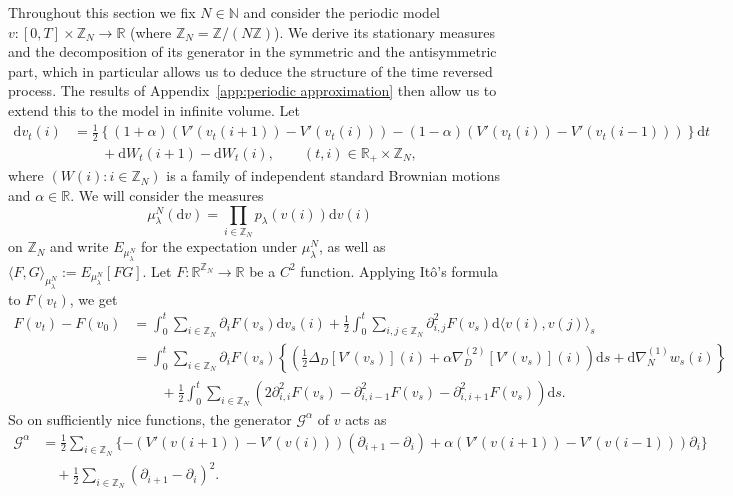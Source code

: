 \documentclass[11pt, a4paper]{article}
\newcommand{\assign}{:=}
\newcommand{\mathd}{\mathrm{d}}
\newcommand{\CG}{\mathscr{G}}
\newcommand{\R}{\mathbb{R}}
\newcommand{\1}{\mathbf{1}}
\newcommand{\Z}{\mathbb{Z}}
\begin{document}
Throughout this section we fix $N \in \mathbb{N}$ and consider the periodic
model $v : [0, T] \times \mathbb{Z}_N \rightarrow \mathbb{R}$ (where
$\mathbb{Z}_N =\mathbb{Z}/ (N\mathbb{Z})$). We derive its stationary
measures and the decomposition of its generator in the symmetric and the
antisymmetric part, which in particular allows us to deduce the structure of
the time reversed process. The results of Appendix~\ref{app:periodic
approximation} then allow us to extend this to the model in infinite volume.
Let
\begin{align}
  \label{eq:periodic GL}\nonumber
  \mathd v_t (i) & = \frac{1}{2} \left\{ (1 + \alpha) (V'
  (v_t (i + 1)) - V' (v_t (i))) -  (1 - \alpha) (V' (v_t (i)) - V'
  (v_t (i - 1))) \right\} \mathd t \\ 
  &\qquad  + \mathd W_t (i + 1) - \mathd W_t (i),  \qquad (t,i) \in \R_+ \times \Z_N,
\end{align}
 where $(W (i) : i \in \mathbb{Z}_N)$ is a family of
independent standard Brownian motions and $\alpha \in \mathbb{R}$. We will
consider the measures
\[ {\mu}_{\lambda}^N (\mathd v) = \prod_{i \in \mathbb{Z}_N} p_{\lambda}
   (v(i)) \mathd v(i) \]
on $\mathbb{Z}_N$ and write $E_{{\mu}^N_{\lambda}}$ for the expectation
under ${\mu}^N_{\lambda}$, as well as $\langle F, G
\rangle_{{\mu}^N_{\lambda}} \assign E_{{\mu}^N_{\lambda}} [F G]$. Let $F \colon
\mathbb{R}^{\mathbb{Z}_N} \rightarrow \mathbb{R}$ be a $C^2$ function.
Applying It{\^o}'s formula to $F (v_t)$, we get
\begin{align*}
   F (v_t) - F (v_0) & = \int_0^t \sum_{i \in \mathbb{Z}_N} \partial_i F (v_s)\mathd v_s (i) + \frac{1}{2} \int_0^t \sum_{i, j \in \mathbb{Z}_N} \partial_{i, j}^2 F (v_s) \mathd \langle v (i), v (j) \rangle_s \\
   & = \int_0^t \sum_{i \in \mathbb{Z}_N} \partial_i F (v_s) \left\{ \left(\frac{1}{2} \Delta_D [V' (v_s)] (i) + \alpha \nabla^{(2)}_D [V' (v_s)] (i)
   \right) \mathd s + \mathd \nabla^{(1)}_N w_s (i) \right\} \\
   & \qquad + \frac{1}{2} \int_0^t \sum_{i \in \mathbb{Z}_N} (2 \partial_{i, i}^2 F (v_s) - \partial_{i, i - 1}^2 F (v_s) - \partial^2_{i, i + 1} F (v_s)) \mathd s.
\end{align*}
So on sufficiently nice  functions, the generator $\CG^{\alpha}$ of $v$ acts as
\begin{align*}
   \CG^{\alpha} & = \frac{1}{2} \sum_{i \in \mathbb{Z}_N} \{ - (V' (v (i + 1)) - V' (v (i))) (\partial_{i + 1} - \partial_i) + \alpha (V' (v (i + 1)) - V'(v (i - 1))) \partial_i \} \\
   &\quad + \frac{1}{2} \sum_{i \in \mathbb{Z}_N} (\partial_{i + 1} - \partial_i)^2.
\end{align*}
\end{document}
